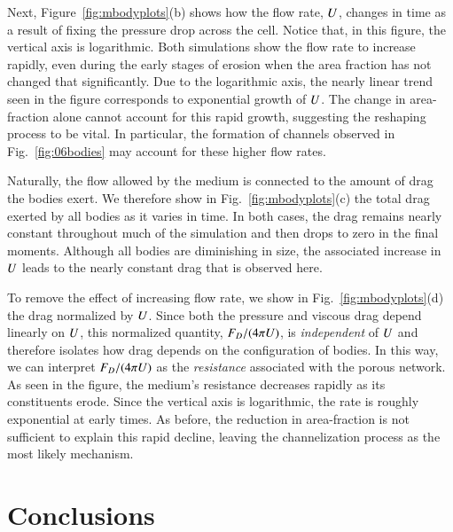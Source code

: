 \documentclass[preprint, 10pt]{elsarticle}
\begin{document}
Next, Figure~\ref{fig:mbodyplots}(b) shows how the flow rate, $U$, changes in time as a result of fixing the pressure drop across the cell. Notice that, in this figure, the vertical axis is logarithmic. Both simulations show the flow rate to increase rapidly, even during the early stages of erosion when the area fraction has not changed that significantly. Due to the logarithmic axis, the nearly linear trend seen in the figure corresponds to exponential growth of $U$. The change in area-fraction alone cannot account for this rapid growth, suggesting the reshaping process to be vital. In particular, the formation of channels observed in Fig.~\ref{fig:06bodies} may account for these higher flow rates.

Naturally, the flow allowed by the medium is connected to the amount of drag the bodies exert. We therefore show in Fig.~\ref{fig:mbodyplots}(c) the total drag exerted by all bodies as it varies in time. In both cases, the drag remains nearly constant throughout much of the simulation and then drops to zero in the final moments. Although all bodies are diminishing in size, the associated increase in $U$ leads to the nearly constant drag that is observed here.

To remove the effect of increasing flow rate, we show in Fig.~\ref{fig:mbodyplots}(d) the drag normalized by $U$. Since both the pressure and viscous drag depend linearly on $U$, this normalized quantity, $F_D / (4 \pi U)$, is {\em independent} of $U$ and therefore isolates how drag depends on the configuration of bodies. In this way, we can interpret $F_D / (4 \pi U)$ as the {\em resistance} associated with the porous network. As seen in the figure, the medium's resistance decreases rapidly as its constituents erode. Since the vertical axis is logarithmic, the rate is roughly exponential at early times. As before, the reduction in area-fraction is not sufficient to explain this rapid decline, leaving the channelization process as the most likely mechanism.



\section{Conclusions\label{s:conclusions}}
\end{document}
